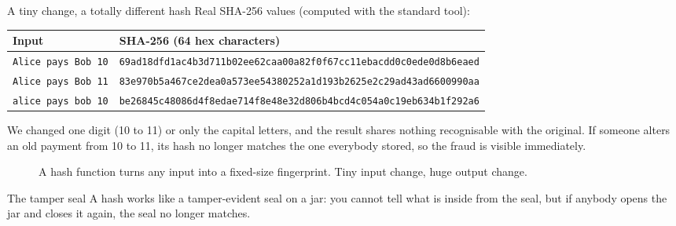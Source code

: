 \begin{examplebox}{A tiny change, a totally different hash}
Real SHA-256 values (computed with the standard  tool):

\medskip
\begin{tabular}{@{}ll@{}}
\textbf{Input} & \textbf{SHA-256 (64 hex characters)}\\
\midrule
\texttt{Alice pays Bob 10} & \texttt{\scriptsize 69ad18dfd1ac4b3d711b02ee62caa00a82f0f67cc11ebacdd0c0ede0d8b6eaed}\\[3pt]
\texttt{Alice pays Bob 11} & \texttt{\scriptsize 83e970b5a467ce2dea0a573ee54380252a1d193b2625e2c29ad43ad6600990aa}\\[3pt]
\texttt{alice pays bob 10} & \texttt{\scriptsize be26845c48086d4f8edae714f8e48e32d806b4bcd4c054a0c19eb634b1f292a6}\\
\end{tabular}

\medskip
We changed one digit (10 to 11) or only the capital letters, and the result shares nothing recognisable with the original. If someone alters an old payment from 10 to 11, its hash no longer matches the one everybody stored, so the fraud is visible immediately.
\end{examplebox}

\begin{figure}[h]
\centering
{}
\caption{A hash function turns any input into a fixed-size fingerprint. Tiny input change, huge output change.}
\end{figure}

\begin{analogybox}{The tamper seal}
A hash works like a tamper-evident seal on a jar: you cannot tell what is inside from the seal, but if anybody opens the jar and closes it again, the seal no longer matches.
\end{analogybox}

